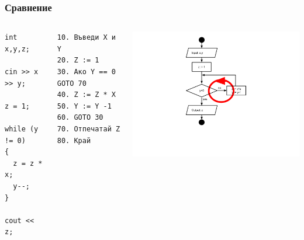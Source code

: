 \documentclass{beamer}
\begin{document}
\begin{frame}[fragile]
\frametitle{Сравнение}


\begin{columns}[t]
  \begin{column}{0.25\textwidth}
\begin{lstlisting}
int x,y,z;

cin >> x >> y;

z = 1;

while (y != 0)
{
  z = z * x;
  y--;
}

cout << z;

\end{lstlisting}


  \end{column}
  \begin{column}{0.25\textwidth}


\begin{verbatim}
10. Въведи X и Y
20. Z := 1
30. Ако Y == 0 GOTO 70
40. Z := Z * X
50. Y := Y -1
60. GOTO 30
70. Отпечатай Z
80. Край   
\end{verbatim}

  \end{column}
  \begin{column}{0.5\textwidth}

\hspace*{-70pt}
\includegraphics[width=11cm]{images/fc_cycle_arrows} 


  \end{column}
\end{columns}


\end{frame}
\end{document}

